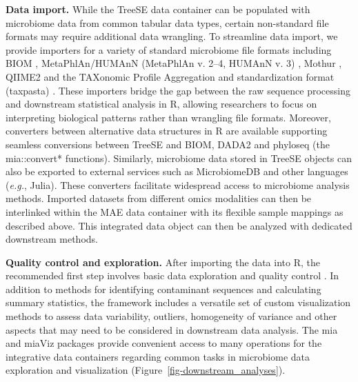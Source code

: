\documentclass[
  sn-nature,
]{sn-jnl}
\begin{document}
\textbf{Data import.} While the TreeSE data container can be populated
with microbiome data from common tabular data types, certain
non-standard file formats may require additional data wrangling. To
streamline data import, we provide importers for a variety of standard
microbiome file formats including BIOM \citep{mcdonald2012},
MetaPhlAn/HUMAnN (MetaPhlAn v. 2--4, HUMAnN v. 3) \citep{mciver2017},
Mothur \citep{schloss2009}, QIIME2 \citep{bolyen2019} and the TAXonomic
Profile Aggregation and standardization format (taxpasta)
\citep{beber2023}. These importers bridge the gap between the raw
sequence processing and downstream statistical analysis in R, allowing
researchers to focus on interpreting biological patterns rather than
wrangling file formats. Moreover, converters between alternative data
structures in R are available supporting seamless conversions between
TreeSE and BIOM, DADA2 \citep{callahan2016} and phyloseq (the
mia::convert* functions). Similarly, microbiome data stored in TreeSE
objects can also be exported to external services such as MicrobiomeDB
\citep{oliveira2018} and other languages (\emph{e.g.}, Julia). These
converters facilitate widespread access to microbiome analysis methods.
Imported datasets from different omics modalities can then be
interlinked within the MAE data container with its flexible sample
mappings as described above. This integrated data object can then be
analyzed with dedicated downstream methods.

\textbf{Quality control and exploration.} After importing the data into
R, the recommended first step involves basic data exploration and
quality control \citep{zuur2010}. In addition to methods for identifying
contaminant sequences and calculating summary statistics, the framework
includes a versatile set of custom visualization methods to assess data
variability, outliers, homogeneity of variance and other aspects that
may need to be considered in downstream data analysis. The mia and
miaViz packages provide convenient access to many operations for the
integrative data containers regarding common tasks in microbiome data
exploration and visualization (Figure~\ref{fig-downstream_analyses}).
\end{document}
